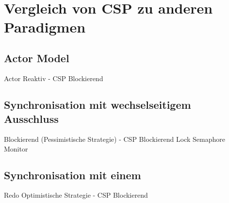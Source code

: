\section{Vergleich von \acs{CSP} zu anderen Paradigmen}

\subsection{Actor Model}
Actor Reaktiv - CSP Blockierend

\subsection{Synchronisation mit wechselseitigem Ausschluss}
Blockierend (Pessimistische Strategie) - CSP Blockierend
Lock
Semaphore
Monitor

\subsection{Synchronisation mit einem }
Redo Optimistische Strategie - CSP Blockierend
